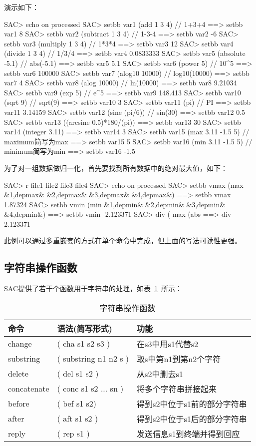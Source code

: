 演示如下：
\begin{SACCode}
SAC> echo on processed
SAC> setbb var1 (add 1 3 4)         // 1+3+4
 ==>  setbb var1 8
SAC> setbb var2 (subtract 1 3 4)    // 1-3-4
 ==>  setbb var2 -6
SAC> setbb var3 (multiply 1 3 4)    // 1*3*4
 ==>  setbb var3 12
SAC> setbb var4 (divide 1 3 4)      // 1/3/4
 ==>  setbb var4 0.0833333
SAC> setbb var5 (absolute -5.1)     // abs(-5.1)
 ==>  setbb var5 5.1
SAC> setbb var6 (power 5)           // 10^5
 ==>  setbb var6 100000
SAC> setbb var7 (alog10 10000)      // log10(10000)
 ==>  setbb var7 4
SAC> setbb var8 (alog 10000)        // ln(10000)
 ==>  setbb var8 9.21034
SAC> setbb var9 (exp 5)             // e^5
 ==>  setbb var9 148.413
SAC> setbb var10 (sqrt 9)           // sqrt(9)
 ==>  setbb var10 3
SAC> setbb var11 (pi)               // PI
 ==>  setbb var11 3.14159
 SAC> setbb var12 (sine (pi/6))     // sin(30)
 ==>  setbb var12 0.5
SAC> setbb var13 ((arcsine 0.5)*180/(pi))
 ==>  setbb var13 30
SAC> setbb var14 (integer 3.11)
 ==>  setbb var14 3
SAC> setbb var15 (max 3.11 -1.5 5)  // maximum简写为max
 ==>  setbb var15 5
SAC> setbb var16 (min 3.11 -1.5 5)  // minimum简写为min
 ==>  setbb var16 -1.5
\end{SACCode}

为了对一组数据做归一化，首先要找到所有数据中的绝对最大值，如下：
\begin{SACCode}
SAC> r file1 file2 file3 file4
SAC> echo on processed
SAC> setbb vmax (max &1,depmax& &2,depmax& &3,depmax& &4,depmax&)
 ==> setbb vmax 1.87324
SAC> setbb vmin (min &1,depmin& &2,depmin& &3,depmin& &4,depmin&)
 ==> setbb vmin -2.123371
SAC> div ( max (abs %
 ==>  div 2.123371
\end{SACCode}
此例可以通过多重嵌套的方式在单个命令中完成，但上面的写法可读性更强。

\subsection{字符串操作函数}
SAC提供了若干个函数用于字符串的处理，如表~\ref{table:string-operation-functions}~所示：

\begin{table}[!ht]
\centering
\ttfamily
\small
\caption{字符串操作函数}
\label{table:string-operation-functions}
\begin{tabular}{lll}
	\toprule
	命令	&	语法(简写形式)	&	功能	\\
	\midrule
	change		&	( cha s1 s2 s3 ) 	&	在s3中用s1代替s2	\\
	substring 	&	( substring n1 n2 s ) 	&	取s中第n1到第n2个字符\\
	delete		&	( del s1 s2 )		&	从s2中删去s1	\\
	concatenate &	( conc s1 s2 ... sn )	&	将多个字符串拼接起来 \\
	before		&	( bef s1 s2)			&	得到s2中位于s1前的部分字符串\\
	after		&	( aft s1 s2 )			&	得到s2中位于s1后的部分字符串\\
	reply		&	( rep s1 )			&	发送信息s1到终端并得到回应	\\
	\bottomrule
\end{tabular}
\end{table}

